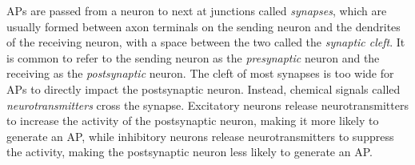 APs are passed from a neuron to next at junctions called \textit{synapses}, which are usually formed between axon terminals on the sending neuron and the dendrites of the receiving neuron, with a space between the two called the \textit{synaptic cleft}. It is common to refer to the sending neuron as the \textit{presynaptic} neuron and the receiving as the \textit{postsynaptic} neuron. The cleft of most synapses is too wide for APs to directly impact the postsynaptic neuron. Instead, chemical signals called \textit{neurotransmitters} cross the synapse. Excitatory neurons release neurotransmitters to increase the activity of the postsynaptic neuron, making it more likely to generate an AP,  while inhibitory neurons release neurotransmitters to suppress the activity, making the postsynaptic neuron less likely to generate an AP.
